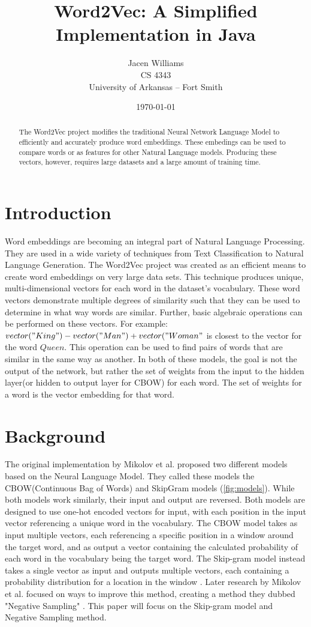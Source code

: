 \documentclass{article}
\title{Word2Vec: A Simplified Implementation in Java }
\author{Jacen Williams \\    
	    CS 4343 \\
	    University of Arkansas -- Fort Smith}
\date{\today}
\begin{document}
\maketitle

\begin{abstract}
	The Word2Vec project modifies the traditional Neural Network Language Model to efficiently and accurately produce word embeddings. These embedings can be used to compare words or as features for other Natural Language models. Producing these vectors, however, requires large datasets and a large amount of training time.
\end{abstract}

\section{Introduction}
Word embeddings are becoming an integral part of Natural Language Processing. They are used in a wide variety of techniques from Text Classification to Natural Language Generation. The Word2Vec project was created as an efficient means to create word embeddings on very large data sets\cite{efficient}. This technique produces unique, multi-dimensional vectors for each word in the dataset's vocabulary. These word vectors demonstrate multiple degrees of similarity\cite{efficient} such that they can be used to determine in what way words are similar. Further, basic algebraic operations can be performed on these vectors. For example: $vector("King") - vector("Man") + vector("Woman"$ is closest to the vector for the word $Queen$\cite{efficient}. This operation can be used to find pairs of words that are similar in the same way as another. In both of these models, the goal is not the output of the network, but rather the set of weights from the input to the hidden layer(or hidden to output layer for CBOW) for each word. The set of weights for a word is the vector embedding for that word.

\section{Background}

The original implementation by Mikolov et al. proposed two different models based on the Neural Language Model\cite{neural}. They called these models the CBOW(Continuous Bag of Words) and SkipGram models (\ref{fig:models}). While both models work similarly, their input and output are reversed. Both models are designed to use one-hot encoded vectors for input, with each position in the input vector referencing a unique word in the vocabulary. The CBOW model takes as input multiple vectors, each referencing a specific position in a window around the target word, and as output a vector containing the calculated probability of each word in the vocabulary being the target word. The Skip-gram model instead takes a single vector as input and outputs multiple vectors, each containing a probability distribution for a location in the window \cite{efficient}. Later research by Mikolov et al. focused on ways to improve this method, creating a method they dubbed "Negative Sampling" \cite{distributed}. This paper will focus on the Skip-gram model and Negative Sampling method.
\end{document}
